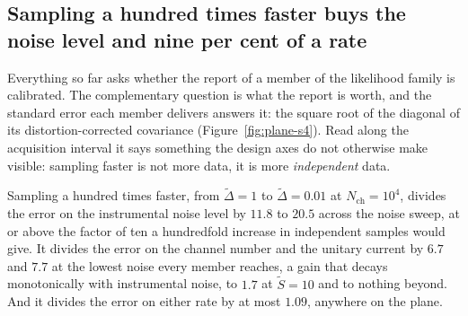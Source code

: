 \subsection*{Sampling a hundred times faster buys the noise level and nine per cent of a rate}

Everything so far asks whether the report of a member of the likelihood family is calibrated. The complementary question is what
the report is worth, and the standard error each member delivers answers it: the square root of the
diagonal of its distortion-corrected covariance (Figure~\ref{fig:plane-s4}). Read
along the acquisition interval it says something the design axes do not otherwise make visible:
sampling faster is not more data, it is more \emph{independent} data.

Sampling a hundred times faster, from $\widetilde{\Delta}=1$ to $\widetilde{\Delta}=0.01$ at
$N_{\mathrm{ch}}=10^{4}$, divides the error on the instrumental noise level by $11.8$ to $20.5$
across the noise sweep, at or above the factor of ten a hundredfold increase in independent samples
would give. It divides the error on the channel number and the unitary current by $6.7$ and $7.7$ at
the lowest noise every member reaches, a gain that decays monotonically with instrumental noise, to
$1.7$ at $\widetilde{S}=10$ and to nothing beyond. And it divides the error on either rate by at
most $1.09$, anywhere on the plane. %

